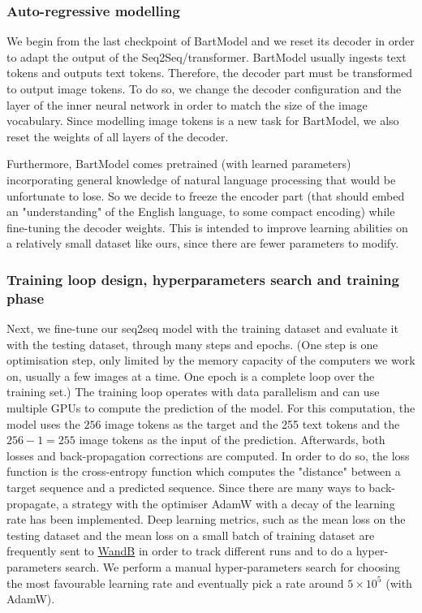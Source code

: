 \documentclass{article}
\begin{document}
\begin{multicols}{2}
\subsubsection{Auto-regressive modelling}

We begin from the last checkpoint of BartModel and we reset its decoder in order to adapt the output of the Seq2Seq/transformer. BartModel usually ingests text tokens and outputs text tokens. Therefore, the decoder part must be transformed to output image tokens. To do so, we change the decoder configuration and the layer of the inner neural network in order to match the size of the image vocabulary. Since modelling image tokens is a new task for BartModel, we also reset the weights of all layers of the decoder.

Furthermore, BartModel comes pretrained (with learned parameters) incorporating general knowledge of natural language processing that would be unfortunate to lose. So we decide to freeze the encoder part (that should embed an "understanding" of the English language, to some compact encoding) while fine-tuning the decoder weights. This is intended to improve learning abilities on a relatively small dataset like ours, since there are fewer parameters to modify.

\subsubsection{Training loop design, hyperparameters search and training phase}

Next, we fine-tune our seq2seq model with the training dataset and evaluate it with the testing dataset, through many steps and epochs. (One step is one optimisation step, only limited by the memory capacity of the computers we work on, usually a few images at a time. One epoch is a complete loop over the training set.) The training loop operates with data parallelism and can use multiple GPUs to compute the prediction of the model. For this computation, the model uses the $256$ image tokens as the target and the 255 text tokens and the $256-1=255$ image tokens as the input of the prediction.
Afterwards, both losses and back-propagation corrections are computed. In order to do so, the loss function is the cross-entropy function which computes the "distance" between a target sequence and a predicted sequence. Since there are many ways to back-propagate, a strategy with the optimiser AdamW with a decay of the learning rate has been implemented.
Deep learning metrics, such as the mean loss on the testing dataset and the mean loss on a small batch of training dataset are frequently sent to \href{https://wandb.ai/cthiounn/dalle-tiny}{WandB} in order to track different runs and to do a hyper-parameters search.
We perform a manual hyper-parameters search for choosing the most favourable learning rate and eventually pick a rate around $5\times 10^5$ (with AdamW).


\end{multicols}
\end{document}
